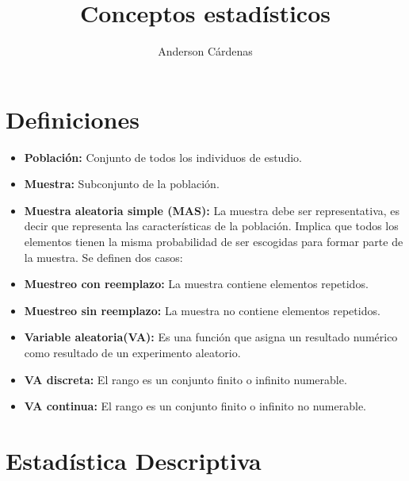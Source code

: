 \documentclass{article}
\author{Anderson Cárdenas}
\title{Conceptos estadísticos}
\begin{document}
    \maketitle
    \section{Definiciones}

    \begin{itemize}
        \item \textbf{Población:} Conjunto de todos los individuos de estudio.
        \item \textbf{Muestra:} Subconjunto de la población.
        \item \textbf{Muestra aleatoria simple (MAS):} La muestra debe ser representativa, es decir que 
        representa las características de la población. Implica que todos los elementos tienen la misma 
        probabilidad de ser escogidas para formar parte de la muestra. Se definen dos casos: 
        \item \textbf{Muestreo con reemplazo:} La muestra contiene elementos repetidos.
        \item \textbf{Muestreo sin reemplazo:} La muestra no contiene elementos repetidos.
        \item \textbf{Variable aleatoria(VA):} Es una función que asigna un resultado numérico como 
        resultado de un experimento aleatorio.
        \item \textbf{VA discreta:} El rango es un conjunto finito o infinito numerable.
        \item \textbf{VA continua:} El rango es un conjunto finito o infinito no numerable.        

    \end{itemize}

    \section{Estadística Descriptiva}
\end{document}
